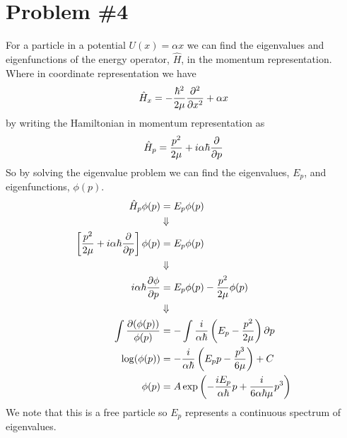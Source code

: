 \documentclass[11pt]{article}
\numberwithin{equation}{section}
\begin{document}
\section{Problem \#4}
For a particle in a potential $U(x) = \alpha{x}$ we can find the eigenvalues and 
eigenfunctions of the energy operator, $\hat{H}$, in the momentum representation. Where
in coordinate representation we have
$$\hat{H}_x = -\frac{\hbar^2}{2\mu}\frac{\partial{^2}}{\partial{x^2}} + \alpha{x}$$
by writing the Hamiltonian in momentum representation as
$$\hat{H}_p = \frac{p^2}{2\mu} + i\alpha\hbar\frac{\partial{}}{\partial{p}}$$
So by solving the eigenvalue problem we can find the eigenvalues, $E_p$, and eigenfunctions,
$\phi(p)$.
\begin{align*}
\hat{H}_p\phi(p) &= E_p\phi(p)\\
&\Downarrow\\
\left[\frac{p^2}{2\mu} + i\alpha\hbar\frac{\partial{}}{\partial{p}}\right]\phi(p) &= E_p\phi(p)\\
&\Downarrow\\
i\alpha\hbar\frac{\partial{\phi}}{\partial{p}} &= E_p\phi(p) - \frac{p^2}{2\mu}\phi(p)\\
&\Downarrow\\
\int\frac{\partial(\phi(p))}{\phi(p)} &= -\int\frac{i}{\alpha\hbar}\left(E_p - \frac{p^2}{2\mu}\right)\partial{p}\\
\log(\phi(p)) &= -\frac{i}{\alpha\hbar}\left(E_pp - \frac{p^3}{6\mu}\right) + C\\
\phi(p) &= A\exp\left(-\frac{iE_p}{\alpha\hbar}p + \frac{i}{6\alpha\hbar\mu}p^3\right)
\end{align*}
We note that this is a free particle so $E_p$ represents a continuous spectrum of eigenvalues.
\end{document}
